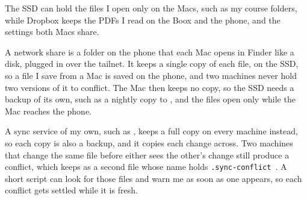 \documentclass[11pt,a4paper]{article}
\begin{document}
 The SSD can hold the files I open only on the Macs, such as my course folders, while Dropbox keeps the PDFs I read on the Boox and the phone, and the settings both Macs share.

 A network share is a folder on the phone that each Mac opens in Finder like a disk, plugged in over the tailnet. It keeps a single copy of each file, on the SSD, so a file I save from a Mac is saved on the phone, and two machines never hold two versions of it to conflict. The Mac then keeps no copy, so the SSD needs a backup of its own, such as a nightly copy to , and the files open only while the Mac reaches the phone.

 A sync service of my own, such as , keeps a full copy on every machine instead, so each copy is also a backup, and it copies each change across. Two machines that change the same file before either sees the other's change still produce a conflict, which  keeps as a second file whose name holds \texttt{.sync-conflict}~\cite{sync}. A short script can look for those files and warn me as soon as one appears, so each conflict gets settled while it is fresh.
\end{document}
